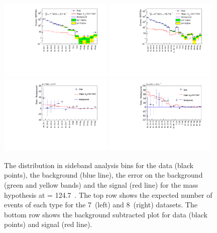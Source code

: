 \begin{figure}
  \includegraphics[width=0.48\textwidth]{analysis/plots/sideband/sideband_model_bfmass_7TeV.pdf}
  \includegraphics[width=0.48\textwidth]{analysis/plots/sideband/sideband_model_bfmass_8TeV.pdf}
  \includegraphics[width=0.48\textwidth]{analysis/plots/sideband/sideband_model_bfmass_7TeV_diff.pdf}
  \includegraphics[width=0.48\textwidth]{analysis/plots/sideband/sideband_model_bfmass_8TeV_diff.pdf}
  \caption[The distribution of data, background and signal for the \acs{SMVA}]{The distribution in sideband analysis bins for the data (black points), the background (blue line), the error on the background (green and yellow bands) and the signal (red line) for the mass hypothesis at \mH= 124.7~\GeV. The top row shows the expected number of events of each type for the 7~\TeV (left) and 8~\TeV (right) datasets. The bottom row shows the background subtracted plot for data (black points) and signal (red line).}
  \label{fig:sideband_output}
\end{figure}

